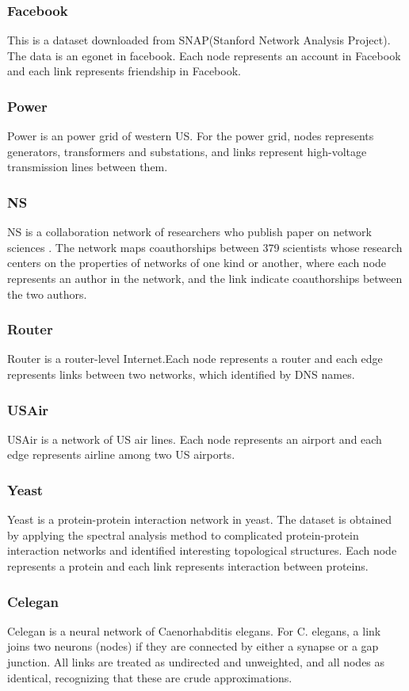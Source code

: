 \documentclass[12pt]{article}
\begin{document}
\subsubsection{Facebook}
This is a dataset downloaded from SNAP(Stanford Network Analysis Project)\cite{snapnets}. The data is an egonet in facebook. Each node represents an account in Facebook and each link represents friendship in Facebook.
\subsubsection{Power}
Power is an power grid of western US.\cite{small_world} For the power grid, nodes represents generators, transformers and substations, and links represent high-voltage transmission lines between them.
\subsubsection{NS}
NS is a collaboration network of researchers who publish paper on network sciences \cite{Newman_2006}. The network maps coauthorships between 379 scientists whose research centers on the properties of networks of one kind or another, where each node represents an author in the network, and the link indicate coauthorships between the two authors.

\subsubsection{Router}
Router is a router-level Internet.\cite{router}Each node represents a router and each edge represents links between two networks, which identified by DNS names.
\subsubsection{USAir}
USAir is a network of US air lines. \cite{usair}Each node represents an airport and each edge represents airline among two US airports.
\subsubsection{Yeast}
Yeast is a protein-protein interaction network in yeast\cite{yeast}. The dataset is obtained by applying the spectral analysis method to complicated protein-protein interaction networks and identified interesting topological structures. Each node represents a protein and each link represents interaction between proteins. 
\subsubsection{Celegan}
Celegan is a neural network of Caenorhabditis elegans.\cite{small_world} For C. elegans, a link joins two neurons (nodes) if they are connected by either a synapse or a gap junction. All links are treated as undirected and unweighted, and all nodes as identical, recognizing that these are crude approximations.
\end{document}
